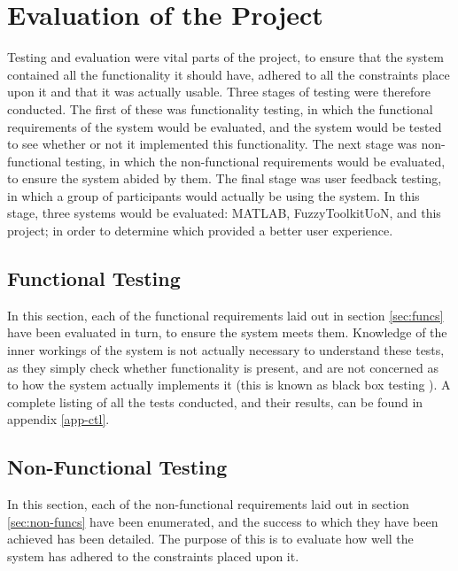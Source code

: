 \section{Evaluation of the Project}
Testing and evaluation were vital parts of the project, to ensure that the system contained all the functionality it should have, adhered to all the constraints place upon it and that it was actually usable. Three stages of testing were therefore conducted. The first of these was functionality testing, in which the functional requirements of the system would be evaluated, and the system would be tested to see whether or not it implemented this functionality. The next stage was non-functional testing, in which the non-functional requirements would be evaluated, to ensure the system abided by them. The final stage was user feedback testing, in which a group of participants would actually be using the system. In this stage, three systems would be evaluated: MATLAB, FuzzyToolkitUoN, and this project; in order to determine which provided a better user experience.

\subsection{Functional Testing}
In this section, each of the functional requirements laid out in section \ref{sec:funcs} have been evaluated in turn, to ensure the system meets them. Knowledge of the inner workings of the system is not actually necessary to understand these tests, as they simply check whether functionality is present, and are not concerned as to how the system actually implements it (this is known as black box testing \cite{beizer1995black}). A complete listing of all the tests conducted, and their results, can be found in appendix \ref{app-ctl}.

\subsection{Non-Functional Testing}
In this section, each of the non-functional requirements laid out in section \ref{sec:non-funcs} have been enumerated, and the success to which they have been achieved has been detailed. The purpose of this is to evaluate how well the system has adhered to the constraints placed upon it.

